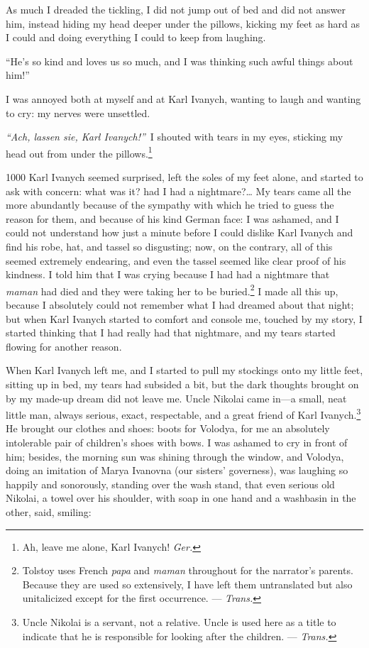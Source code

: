 As much I dreaded the tickling, I did not jump out of bed and did not answer him, instead hiding my head deeper under the pillows, kicking my feet as hard as I could and doing everything I could to keep from laughing.

``He's so kind and loves us so much, and I was thinking such awful things about him!'' %

I was annoyed both at myself and at Karl Ivanych, wanting to laugh and wanting to cry: my nerves were unsettled.

\textit{``Ach, lassen sie, Karl Ivanych!''}~I shouted with tears in my eyes, sticking my head out from under the pillows.\footnote{Ah, leave me alone, Karl Ivanych! \textit{Ger.}} %

\begin{tolerant}{1000}
Karl Ivanych seemed surprised, left the soles of my feet alone, and started to ask with concern: what was it? had I had a nightmare?\ldots{} My tears came all the more abundantly because of the sympathy with which he tried to guess the reason for them, and because of his kind German face: I was ashamed, and I could not understand how just a minute before I could dislike Karl Ivanych and find his robe, hat, and tassel so disgusting; now, on the contrary, all of this seemed extremely endearing, and even the tassel seemed like clear proof of his kindness. I told him that I was crying because I had had a nightmare that \textit{maman} had died and they were taking her to be buried.\footnote{Tolstoy uses French \textit{papa} and \textit{maman} throughout for the narrator's parents. Because they are used so extensively, I have left them untranslated but also unitalicized except for the first occurrence. --- \textit{Trans.}} I made all this up, because I absolutely could not remember what I had dreamed about that night; but when Karl Ivanych started to comfort and console me, touched by my story, I started thinking that I had really had that nightmare, and my tears started flowing for another reason. 
\end{tolerant}

When Karl Ivanych left me, and I started to pull my stockings onto my little feet, sitting up in bed, my tears had subsided a bit, but the dark thoughts brought on by my made-up dream did not leave me. Uncle Nikolai came in---a small, neat little man, always serious, exact, respectable, and a great friend of Karl Ivanych.\footnote{Uncle Nikolai is a servant, not a relative. Uncle is used here as a title to indicate that he is responsible for looking after the children. --- \textit{Trans.}} He brought our clothes and shoes: boots for Volodya, for me an absolutely intolerable pair of children's shoes with bows. I was ashamed to cry in front of him; besides, the morning sun was shining through the window, and Volodya, doing an imitation of Marya Ivanovna (our sisters' governess), was laughing so happily and sonorously, standing over the wash stand, that even serious old Nikolai, a towel over his shoulder, with soap in one hand and a washbasin in the other, said, smiling:

